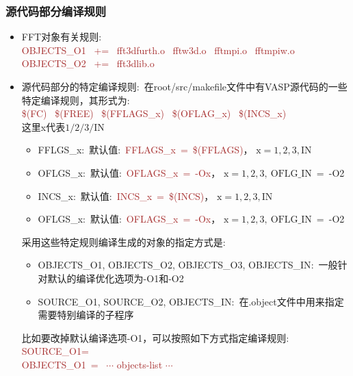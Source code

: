 \subsubsection{\rm{源代码部分编译规则}}
\begin{itemize}
	\item \textrm{FFT}对象有关规则:\\
		\textcolor{brown}{\textrm{
			OBJECTS\_O1 ~+= ~fft3dfurth.o ~fftw3d.o ~fftmpi.o ~fftmpiw.o\\
OBJECTS\_O2 ~+= ~fft3dlib.o }}
	\item 源代码部分的特定编译规则:~在\textrm{root/src/makefile}文件中有\textrm{VASP}源代码的一些特定编译规则，其形式为:\\
		\textcolor{brown}{\textrm{\$(FC) ~\$(FREE) ~\$(FFLAGS\_x) ~\$(OFLAG\_x) ~\$(INCS\_x)}}\\
		这里\textrm{x}代表$1/2/3/\mathrm{IN}$
		\begin{itemize}
			\item \textrm{FFLGS\_x}:~默认值:~\textcolor{brown}{\textrm{FFLAGS\_x~=~\$(FFLAGS)}}， $\mathrm{x}=1, 2, 3, \mathrm{IN}$
			\item \textrm{OFLGS\_x}:~默认值:~\textcolor{brown}{\textrm{OFLAGS\_x~=~-Ox}}， $\mathrm{x}=1, 2, 3, ~\mathrm{OFLG\_IN}$~=~-O2
			\item \textrm{INCS\_x}:~默认值:~\textcolor{brown}{\textrm{INCS\_x~=~\$(INCS)}}， $\mathrm{x}=1, 2, 3, \mathrm{IN}$
			\item \textrm{OFLGS\_x}:~默认值:~\textcolor{brown}{\textrm{OFLAGS\_x~=~-Ox}}， $\mathrm{x}=1, 2, 3, ~\mathrm{OFLG\_IN}$~=~-O2
		\end{itemize}
		采用这些特定规则编译生成的对象的指定方式是:~
		\begin{itemize}
			\item \textrm{OBJECTS\_O1, OBJECTS\_O2, OBJECTS\_O3, OBJECTS\_IN}:~一般针对默认的编译优化选项为\textrm{-O1}和\textrm{-O2}
			\item \textrm{SOURCE\_O1, SOURCE\_O2, OBJECTS\_IN}:~在\textrm{.object}文件中用来指定需要特别编译的子程序
		\end{itemize}
		比如要改掉默认编译选项\textrm{-O1}，可以按照如下方式指定编译规则:~\\
		\textcolor{brown}{\textrm{
			SOURCE\_O1=\\
OBJECTS\_O1~= ~$\cdots$ objects-list $\cdots$ }}
\end{itemize}
